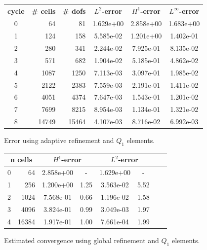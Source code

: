 \documentclass[11pt,fullpage]{article}
\theoremstyle{lemma}
\theoremstyle{definition}
\theoremstyle{lemma}
\begin{document}
\begin{figure}[!ht]
	\centering
	\begin{tabular}{|c|r|r|c|c|c|} \hline
		cycle & \# cells & \# dofs &$L^2$-error & $H^1$-error & $L^\infty$-error\\ \hline
		0 & 64 & 81 & 1.629e+00 & 2.858e+00 & 1.683e+00\\ \hline
		1 & 124 & 158 & 5.585e-02 & 1.201e+00 & 1.402e-01\\ \hline
		2 & 280 & 341 & 2.244e-02 & 7.925e-01 & 8.135e-02\\ \hline
		3 & 571 & 682 & 1.904e-02 & 5.185e-01 & 4.862e-02\\ \hline
		4 & 1087 & 1250 & 7.113e-03 & 3.097e-01 & 1.985e-02\\ \hline
		5 & 2122 & 2383 & 7.559e-03 & 2.191e-01 & 1.411e-02\\ \hline
		6 & 4051 & 4374 & 7.647e-03 & 1.543e-01 & 1.201e-02\\ \hline
		7 & 7699 & 8215 & 8.954e-03 & 1.134e-01 & 1.321e-02\\ \hline
		8 & 14749 & 15464 & 4.107e-03 & 8.716e-02 & 6.992e-03\\ \hline
	\end{tabular}
	\caption{Error using adaptive refinement and $Q_1$ elements.}
\end{figure}
\clearpage
\begin{figure}[!ht]
	\centering
	\begin{tabular}{|c|r|c|c|c|c|c|c|} \hline
		\multicolumn{2}{|c|}{n cells} & 
		\multicolumn{2}{|c|}{$H^1$-error} & 
		\multicolumn{2}{|c|}{$L^2$-error}\\ \hline
		0 & 64 & 2.858e+00 &  - & 1.629e+00 & -\\ \hline
		1 & 256 & 1.200e+00 &  1.25 & 3.563e-02 &  5.52\\ \hline
		2 & 1024 & 7.568e-01 &  0.66 & 1.196e-02 &  1.58\\ \hline
		3 & 4096 & 3.824e-01 &  0.99 & 3.049e-03 &  1.97\\ \hline
		4 & 16384 & 1.917e-01 &  1.00 & 7.661e-04 &  1.99\\ \hline
	\end{tabular}
	\caption{Estimated convergence using global refinement and $Q_1$ elements.}
\end{figure}
\end{document}
